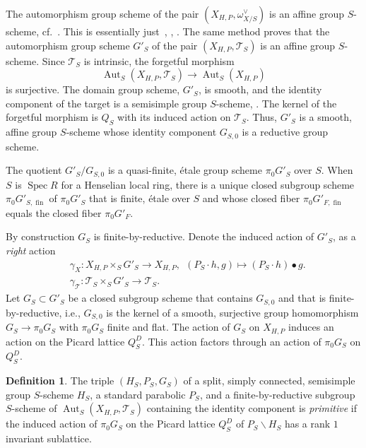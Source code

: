 \documentclass[11pt]{article}
\theoremstyle{definition}
\newtheorem{defi}[theo]{Definition}
\numberwithin{equation}{section}
\numberwithin{figure}{section}
\numberwithin{table}{section}
\newcommand{\mc}{\mathcal}
\newcommand{\mcT}{\mc{T}}
\DeclareMathOperator{\SP}{Spec}
\DeclareMathOperator{\Aut}{Aut}
\DeclareMathOperator{\fin}{fin}
\begin{document}
The automorphism group scheme of the pair $(X_{H,P},\omega_{X/S}^\vee)$ is an affine group $S$-scheme, cf.~\cite[Section~2.1]{dJS8}. This is essentially just~\cite[No. 221, Section~4.c]{FGA}, \cite[Corollaire~7.7.8]{EGA3}, \cite[Théorème~4.6.2.1]{LM-B}. The same method proves that the automorphism group scheme $G'_S$ of the pair $(X_{H,P},\mcT_S)$ is an affine group $S$-scheme. Since $\mcT_S$ is intrinsic, the forgetful morphism
\[
\Aut_S(X_{H,P},\mcT_S) \to \Aut_S(X_{H,P})
\]
is surjective. The domain group scheme, $G'_S$, is smooth, and the identity component of the target is a semisimple group $S$-scheme, \cite[Proposition~4]{Demazure-Aut}. The kernel of the forgetful morphism is $Q_S$ with its induced action on $\mcT_S$. Thus, $G'_S$ is a smooth, affine group $S$-scheme whose identity component $G_{S,0}$ is a reductive group scheme.

The quotient $G'_S/G_{S,0}$ is a quasi-finite, étale group scheme $\pi_0 G'_S$ over $S$. When $S$ is $\SP R$ for a Henselian local ring, there is a unique closed subgroup scheme $\pi_0 G'_{S,\fin}$ of $\pi_0 G'_S$ that is finite, étale over $S$ and whose closed fiber $\pi_0 G'_{F,\fin}$ equals the closed fiber $\pi_0 G'_F$.


By construction $G_S$ is finite-by-reductive. Denote the induced action of $G'_S$, as a
\emph{right} action
\begin{align*}
&\gamma_X: X_{H,P} \times_S G'_S \to X_{H,P}, \ \ (P_S\cdot h,g) \mapsto (P_S\cdot h)\bullet g.
\\
&\gamma_\mcT: \mcT_S \times_S G'_S \to \mcT_S.
\end{align*}
Let $G_S\subset G'_S$ be a closed subgroup scheme that contains $G_{S,0}$ and that is finite-by-reductive, i.e., $G_{S,0}$ is the kernel of a smooth, surjective group homomorphism $G_S\to \pi_0 G_S$ with $\pi_0 G_S$ finite and flat. The action of $G_S$ on $X_{H,P}$ induces an action on the Picard lattice $Q_S^D$. This action factors through an action of $\pi_0 G_S$ on $Q_S^D$.

\begin{defi} \label{defn-prim}
The triple $(H_S,P_S,G_S)$ of a split, simply connected, semisimple group $S$-scheme $H_S$, a standard parabolic $P_S$, and a finite-by-reductive subgroup $S$-scheme of $\Aut_S(X_{H,P},\mcT_S)$ containing the identity component is \emph{primitive} if the induced action of $\pi_0 G_S$ on the Picard lattice $Q^D_S$ of $P_S\backslash H_S$ has a rank $1$ invariant sublattice.
\end{defi}
\end{document}
